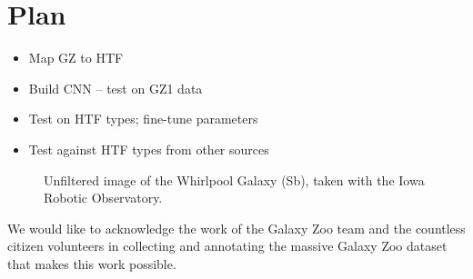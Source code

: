 \documentclass[twocolumn]{aastex6}
\begin{document}
\cite{2014arXiv1409.4842S}

\section{Plan}
\begin{itemize}
\item	Map GZ to HTF
\item	Build CNN -- test on GZ1 data
\item	Test on HTF types; fine-tune parameters
\item	Test against HTF types from other sources
\end{itemize}



\begin{figure}[!t]
\caption{Unfiltered image of the Whirlpool Galaxy (Sb), taken with the Iowa Robotic Observatory.}
\end{figure}

We would like to acknowledge the work of the Galaxy Zoo team and the countless citizen volunteers in collecting and annotating the massive Galaxy Zoo dataset that makes this work possible. 


\end{document}
